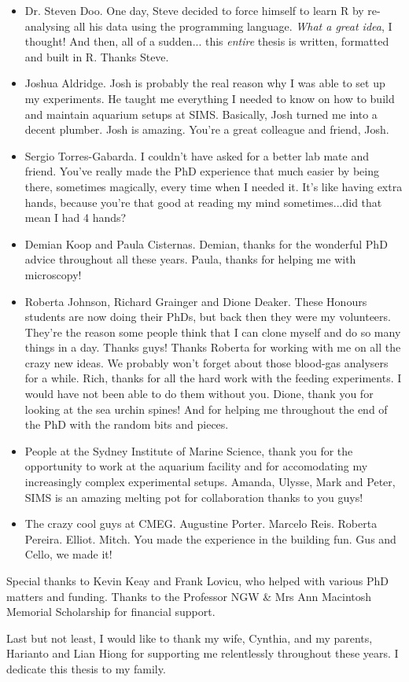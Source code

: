 \begin{itemize}
  \item Dr. Steven Doo. One day, Steve decided to force himself to learn R by re-analysing all his data using the programming language. \textit{What a great idea}, I thought! And then, all of a sudden... this \textit{entire} thesis is written, formatted and built in R. Thanks Steve.
  \item Joshua Aldridge. Josh is probably the real reason why I was able to set up my experiments. He taught me everything I needed to know on how to build and maintain aquarium setups at SIMS. Basically, Josh turned me into a decent plumber. Josh is amazing. You're a great colleague and friend, Josh.
  \item Sergio Torres-Gabarda. I couldn't have asked for a better lab mate and friend. You've really made the PhD experience that much easier by being there, sometimes magically, every time when I needed it. It's like having extra hands, because you're that good at reading my mind sometimes...did that mean I had 4 hands?
  \item Demian Koop and Paula Cisternas. Demian, thanks for the wonderful PhD advice throughout all these years. Paula, thanks for helping me with microscopy!
  \item Roberta Johnson, Richard Grainger and Dione Deaker. These Honours students are now doing their PhDs, but back then they were my volunteers. They're the reason some people think that I can clone myself and do so many things in a day. Thanks guys! Thanks Roberta for working with me on all the crazy new ideas. We probably won't forget about those blood-gas analysers for a while. Rich, thanks for all the hard work with the feeding experiments. I would have not been able to do them without you. Dione, thank you for looking at the sea urchin spines! And for helping me throughout the end of the PhD with the random bits and pieces.
  \item People at the Sydney Institute of Marine Science, thank you for the opportunity to work at the aquarium facility and for accomodating my increasingly complex experimental setups. Amanda, Ulysse, Mark and Peter, SIMS is an amazing melting pot for collaboration thanks to you guys! 
  \item The crazy cool guys at CMEG. Augustine Porter. Marcelo Reis. Roberta Pereira. Elliot. Mitch. You made the experience in the building fun. Gus and Cello, we made it!
\end{itemize}

Special thanks to Kevin Keay and Frank Lovicu, who helped with various PhD matters and funding. Thanks to the Professor NGW \& Mrs Ann Macintosh Memorial Scholarship for financial support.

Last but not least, I would like to thank my wife, Cynthia, and my parents, Harianto and Lian Hiong for supporting me relentlessly throughout these years. I dedicate this thesis to my family.


\clearpage
